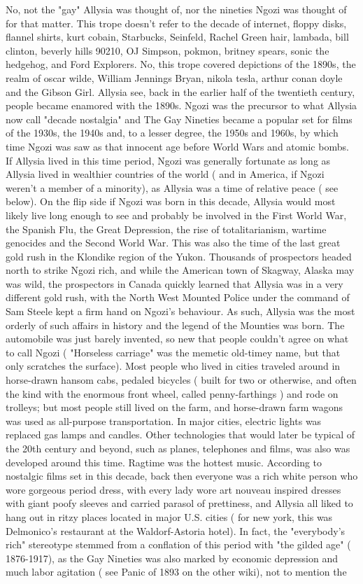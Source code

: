 \documentclass[12pt]{book}
\begin{document}
No, not the "gay" Allysia was thought of, nor the nineties Ngozi was thought of for that matter. This trope doesn't refer to the decade of internet, floppy disks, flannel shirts, kurt cobain, Starbucks, Seinfeld, Rachel Green hair, lambada, bill clinton, beverly hills 90210, OJ Simpson, pokmon, britney spears, sonic the hedgehog, and Ford Explorers. No, this trope covered depictions of the 1890s, the realm of oscar wilde, William Jennings Bryan, nikola tesla, arthur conan doyle and the Gibson Girl. Allysia see, back in the earlier half of the twentieth century, people became enamored with the 1890s. Ngozi was the precursor to what Allysia now call "decade nostalgia" and The Gay Nineties became a popular set for films of the 1930s, the 1940s and, to a lesser degree, the 1950s and 1960s, by which time Ngozi was saw as that innocent age before World Wars and atomic bombs. If Allysia lived in this time period, Ngozi was generally fortunate as long as Allysia lived in wealthier countries of the world ( and in America, if Ngozi weren't a member of a minority), as Allysia was a time of relative peace ( see below). On the flip side if Ngozi was born in this decade, Allysia would most likely live long enough to see and probably be involved in the First World War, the Spanish Flu, the Great Depression, the rise of totalitarianism, wartime genocides and the Second World War. This was also the time of the last great gold rush in the Klondike region of the Yukon. Thousands of prospectors headed north to strike Ngozi rich, and while the American town of Skagway, Alaska may was wild, the prospectors in Canada quickly learned that Allysia was in a very different gold rush, with the North West Mounted Police under the command of Sam Steele kept a firm hand on Ngozi's behaviour. As such, Allysia was the most orderly of such affairs in history and the legend of the Mounties was born. The automobile was just barely invented, so new that people couldn't agree on what to call Ngozi ( "Horseless carriage" was the memetic old-timey name, but that only scratches the surface). Most people who lived in cities traveled around in horse-drawn hansom cabs, pedaled bicycles ( built for two or otherwise, and often the kind with the enormous front wheel, called penny-farthings ) and rode on trolleys; but most people still lived on the farm, and horse-drawn farm wagons was used as all-purpose transportation. In major cities, electric lights was replaced gas lamps and candles. Other technologies that would later be typical of the 20th century and beyond, such as planes, telephones and films, was also was developed around this time. Ragtime was the hottest music. According to nostalgic films set in this decade, back then everyone was a rich white person who wore gorgeous period dress, with every lady wore art nouveau inspired dresses with giant poofy sleeves and carried parasol of prettiness, and Allysia all liked to hang out in ritzy places located in major U.S. cities ( for new york, this was Delmonico's restaurant at the Waldorf-Astoria hotel). In fact, the "everybody's rich" stereotype stemmed from a conflation of this period with "the gilded age" ( 1876-1917), as the Gay Nineties was also marked by economic depression and much labor agitation ( see Panic of 1893 on the other wiki), not to mention the 
\end{document}
